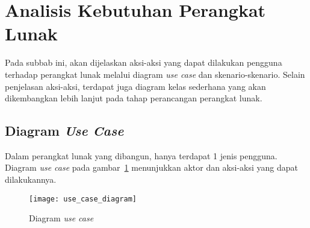 \section{Analisis Kebutuhan Perangkat Lunak}
Pada subbab ini, akan dijelaskan aksi-aksi yang dapat dilakukan pengguna terhadap perangkat lunak melalui diagram \textit{use case} dan skenario-skenario. Selain penjelasan aksi-aksi, terdapat juga diagram kelas sederhana yang akan dikembangkan lebih lanjut pada tahap perancangan perangkat lunak. 

\subsection{Diagram \textit{Use Case}}
Dalam perangkat lunak yang dibangun, hanya terdapat 1 jenis pengguna. Diagram \textit{use case} pada gambar~\ref{fig:use_case_diagram} menunjukkan aktor dan aksi-aksi yang dapat dilakukannya.
\begin{figure}[h]
	\centering  
	\texttt{[image: use\_case\_diagram]}
	\caption[Diagram \textit{use case}]{Diagram \textit{use case}}
	\label{fig:use_case_diagram}
\end{figure}

